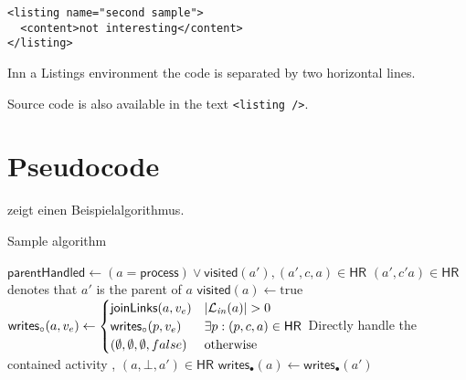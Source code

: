 \begin{Listing}
  \begin{lstlisting}
<listing name="second sample">
  <content>not interesting</content>
</listing>
\end{lstlisting}
  \caption{Inn a Listings environment the code is separated by two horizontal lines.}
  \label{lst:ListingANDlstlisting}
\end{Listing}

Source code is also available in the text \lstinline|<listing />|.


\section{Pseudocode}
 zeigt einen Beispielalgorithmus.
\begin{Algorithmus} %
  \caption{Sample algorithm}
  \label{alg:sample}
  \begin{algorithmic}
\State $\mathsf{parentHandled} \gets (a = \mathsf{process}) \lor \mathsf{visited}(a'), (a',c,a) \in \mathsf{HR}$
\State \Comment $(a',c'a) \in \mathsf{HR}$ denotes that $a'$ is the parent of $a$
\State $\mathsf{visited}(a) \gets \text{true}$
\State $\mathsf{writes}_\circ(a,v_e) \gets
\begin{cases}
\mathsf{joinLinks}(a,v_e) & \left\lvert\mathcal{L}_\mathit{in}(a)\right\rvert > 0\\
\mathsf{writes}_\circ(p,v_e)
& \exists p: (p,c,a) \in \mathsf{HR}\\
(\emptyset, \emptyset, \emptyset, false) & \text{otherwise}
\end{cases}
$
  \State {}
  \State {}
 \Comment Directly handle the contained activity
  \State {}, $(a,\bot,a') \in \mathsf{HR}$
  \State $\mathsf{writes}_\bullet(a) \gets \mathsf{writes}_\bullet(a')$
\EndIf
{}
  \State {}
\EndFor
\EndIf
\EndProcedure
  \end{algorithmic}
\end{Algorithmus}

